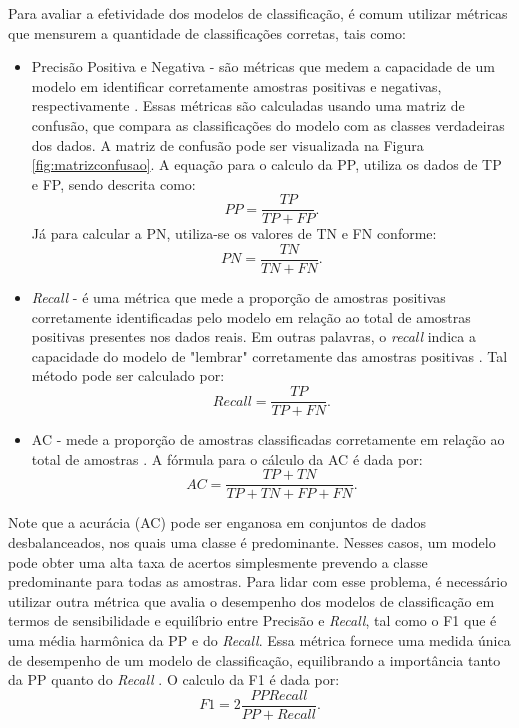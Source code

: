 Para avaliar a efetividade dos modelos de classificação, é comum utilizar métricas que mensurem a quantidade de classificações corretas, tais como:
\begin{itemize}   
    \item Precisão Positiva e Negativa - são métricas que medem a capacidade de um modelo em identificar corretamente amostras positivas e negativas, respectivamente \cite{Xiaoci_Predicting}. Essas métricas são calculadas usando uma matriz de confusão, que compara as classificações do modelo com as classes verdadeiras dos dados. A matriz de confusão pode ser visualizada na Figura \ref{fig:matrizconfusao}. A equação para o calculo da \ac{PP}, utiliza os dados de \ac{TP} e \ac{FP}, sendo descrita como: 
    \begin{equation}
        \label{eq:PP}
        PP = \frac{TP}{TP+FP}.
    \end{equation}
    Já para calcular a \ac{PN}, utiliza-se os valores de \ac{TN} e \ac{FN} conforme:
    \begin{equation}
        \label{eq:PN}
        PN = \frac{TN}{TN + FN}.
    \end{equation}

    \item \textit{Recall} - é uma métrica que mede a proporção de amostras positivas corretamente identificadas pelo modelo em relação ao total de amostras positivas presentes nos dados reais. Em outras palavras, o \textit{recall} indica a capacidade do modelo de "lembrar"  corretamente das amostras positivas \cite{ampomah2020evaluation}. Tal método pode ser calculado por: 
    \begin{equation}
        \label{eq:recall}
        Recall = \frac{TP}{TP + FN}.
    \end{equation}
    
    \item \ac{AC} - mede a proporção de amostras classificadas corretamente em relação ao total de amostras \cite{ampomah2020evaluation, vinicius_sistemas, lee2021exploring}. A fórmula para o cálculo da \ac{AC} é dada por:
    \begin{equation}
        \label{AC}
        AC = \frac{TP + TN}{TP + TN + FP + FN}.
    \end{equation}    
\end{itemize}

Note que a acurácia (AC) pode ser enganosa em conjuntos de dados desbalanceados, nos quais uma classe é predominante. Nesses casos, um modelo pode obter uma alta taxa de acertos simplesmente prevendo a classe predominante para todas as amostras. Para lidar com esse problema, é necessário utilizar outra métrica que avalia o desempenho dos modelos de classificação em termos de sensibilidade e equilíbrio entre Precisão e \textit{Recall}, tal como o \ac{F1} que é uma média harmônica da \ac{PP} e do \textit{Recall}. Essa métrica fornece uma medida única de desempenho de um modelo de classificação, equilibrando a importância tanto da \ac{PP} quanto do \textit{Recall} \cite{jiang2020improved}. O calculo da \ac{F1} é dada por: 
\begin{equation}
  \label{eq:F1}
  F1 = 2 \frac{PP  \textit{Recall}}{PP + \textit{Recall}}.
\end{equation}

